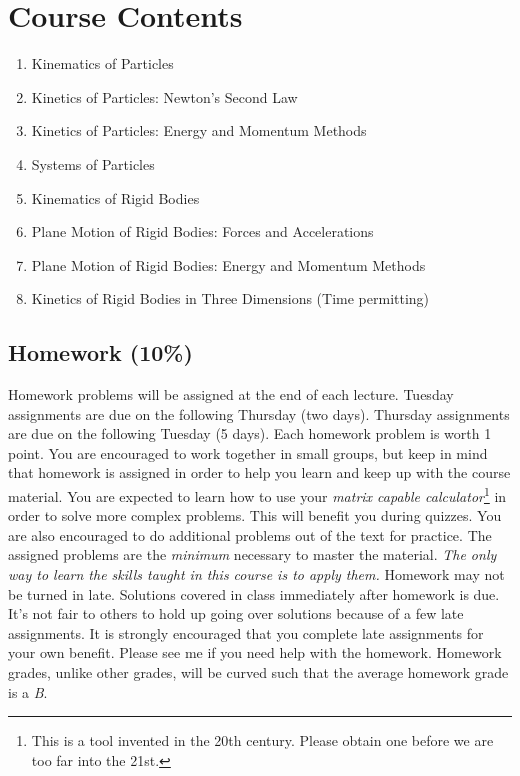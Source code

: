 \documentclass[10pt]{article}
\begin{document}
\section*{Course Contents}
\begin{enumerate}
\setlength{\itemsep}{0pt}
	\item Kinematics of Particles
	\item Kinetics of Particles: Newton's Second Law
	\item Kinetics of Particles: Energy and Momentum Methods
	\item Systems of Particles
	\item Kinematics of Rigid Bodies
	\item Plane Motion of Rigid Bodies: Forces and Accelerations
	\item Plane Motion of Rigid Bodies: Energy and Momentum Methods
	\item Kinetics of Rigid Bodies in Three Dimensions (Time permitting)
\end{enumerate}

\subsection*{Homework (10\%)}
Homework problems will be assigned at the end of each lecture.  Tuesday assignments are due on the following Thursday (two days).  Thursday assignments are due on the following Tuesday (5 days).  Each homework problem is worth 1 point.  You are encouraged to work together in small groups, but keep in mind that homework is assigned in order to help you learn and keep up with the course material.  You are expected to learn how to use your \emph{matrix capable calculator}\footnote{This is a tool invented in the 20th century. Please obtain one before we are too far into the 21st.} in order to solve more complex problems.  This will benefit you during quizzes.  You are also encouraged to do additional problems out of the text for practice.  The assigned problems are the \emph{minimum} necessary to master the material.  \emph{The only way to learn the skills taught in this course is to apply them.} Homework may not be turned in late.  Solutions covered in class immediately after homework is due.  It's not fair to others to hold up going over solutions because of a few late assignments.  It is strongly encouraged that you complete late assignments for your own benefit.  Please see me if you need help with the homework.  Homework grades, unlike other grades,  will be curved such that the average homework grade is a \emph{B}.
\end{document}
